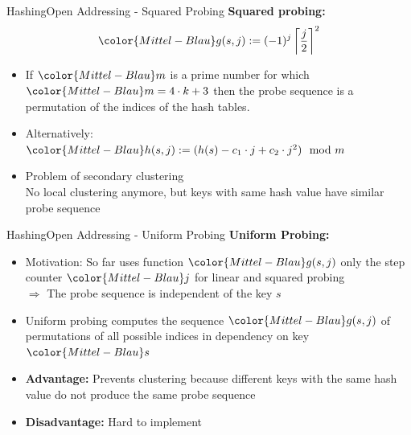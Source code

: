 
\begin{frame}{Hashing}{Open Addressing - Squared Probing}
  \textbf{Squared probing:}
  \begin{displaymath}
    {\color{Mittel-Blau}g(s,j)
    := (-1)^j
    \left\lceil \frac{j}{2} \right\rceil^2}
  \end{displaymath}
  \vspace{-1.0em}
  \begin{itemize}
    \item<2->
      If ${\color{Mittel-Blau}m}$ is a prime number for which
      \begin{math}
        {\color{Mittel-Blau}m = 4 \cdot k + 3}
      \end{math}
      then the probe sequence is a permutation of the indices of
      the hash tables.
   \item<3->
      Alternatively:
      \begin{math}
        {\color{Mittel-Blau}h(s,j) := (h(s) - c_1 \cdot j + c_2 \cdot j^2) \mod m}
      \end{math}
    \item<4->
      Problem of secondary clustering\\
      No local clustering anymore, but keys with same hash value
      have similar probe sequence
      
  \end{itemize}
\end{frame}


\begin{frame}{Hashing}{Open Addressing - Uniform Probing}
  \textbf{Uniform Probing:}
  \begin{itemize}
    \item<2->
      Motivation: So far uses function ${\color{Mittel-Blau}g(s,j)}$ only the step
      counter ${\color{Mittel-Blau}j}$ for linear and squared probing\\
      {\color{red}$\Rightarrow$ The probe sequence is independent of the key
        $s$ }
    \item<3->
      Uniform probing computes the sequence ${\color{Mittel-Blau}g(s,j)}$ of permutations of all possible indices in dependency on key ${\color{Mittel-Blau}s}$ 
    \item<4->
      \textbf{Advantage:}
      Prevents clustering because different keys with the same hash
      value do not produce 
      the same probe sequence
    \item<5->
      \textbf{Disadvantage:}
      Hard to implement
  \end{itemize}
\end{frame}

